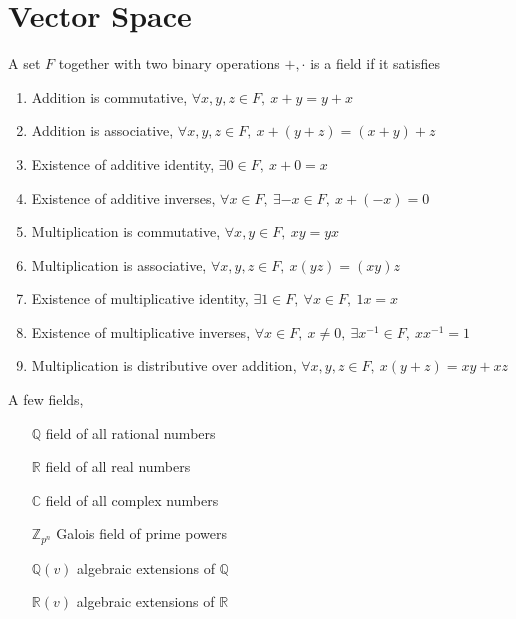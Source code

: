 \section{Vector Space}
	\begin{axiom}[Field]
		A set $F$ together with two binary operations $+,\cdot$ is a field if it satisfies
		\begin{enumerate} 
			\item Addition is commutative, $\forall x,y,z \in F,\ x+y = y+x$
			\item Addition is associative, $\forall x,y,z \in F,\ x+(y+z) = (x+y)+z$
			\item Existence of additive identity, $\exists 0 \in F,\ x+0=x$
			\item Existence of additive inverses, $\forall x \in F,\ \exists -x \in F,\ x+(-x)=0$
			\item Multiplication is commutative, $\forall x,y \in F,\ xy = yx$
			\item Multiplication is associative, $\forall x,y,z \in F,\ x(yz) = (xy)z$
			\item Existence of multiplicative identity, $\exists 1 \in F,\ \forall x \in F,\ 1x = x$
			\item Existence of multiplicative inverses, $\forall x \in F,\ x \ne 0,\ \exists x^{-1} \in F,\ xx^{-1} = 1$
			\item Multiplication is distributive over addition, $\forall x,y,z \in F,\ x(y+z) = xy+xz$
		\end{enumerate}
	\end{axiom}
	\begin{remark}
		A few fields,
		\begin{enumerate}
			\item[$\mathbb{Q}$] field of all rational numbers
			\item[$\mathbb{R}$] field of all real numbers
			\item[$\mathbb{C}$] field of all complex numbers
			\item[$\mathbb{Z}_{p^n}$] Galois field of prime powers
			\item[$\mathbb{Q}(v)$] algebraic extensions of $\mathbb{Q}$
			\item[$\mathbb{R}(v)$] algebraic extensions of $\mathbb{R}$
		\end{enumerate}
	\end{remark}
